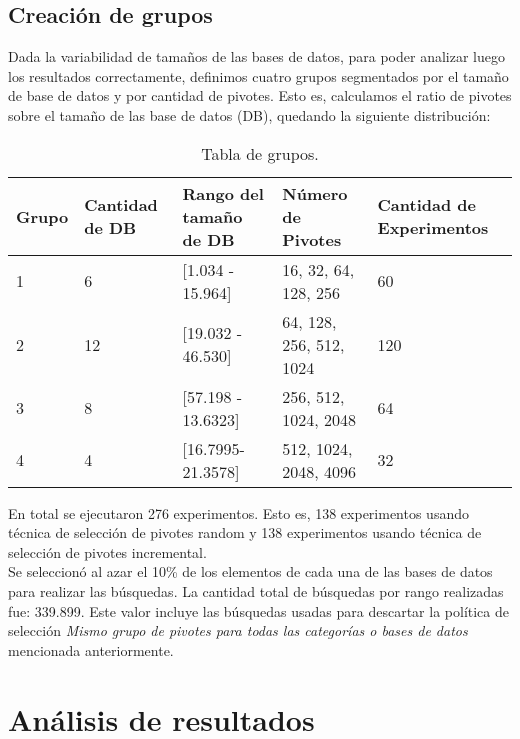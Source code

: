 \subsection{Creaci\'on de grupos}

Dada la variabilidad de tamaños de las bases de datos, para poder analizar luego los resultados correctamente, definimos cuatro grupos segmentados por el tamaño de base de datos y por cantidad de pivotes. Esto es, calculamos el ratio de pivotes sobre el tamaño de las base de datos (DB), quedando la siguiente distribuci\'on:\\

\begin{table}[htbp]
\begin{center}
\begin{tabular}{|p{1.1cm}|p{1.8cm}|p{3.2cm}|p{2.2cm}|p{2.5cm}|}
\hline
Grupo & 
Cantidad de DB & 
Rango del tama\~no de DB & 
N\'umero de Pivotes &  
Cantidad de Experimentos\\
\hline \hline
1 & 
6 & 
[1.034 - 15.964] & 
16, 32, 64, 128, 256 & 
60  \\ \hline
2 &
12 &
[19.032 - 46.530] &
64, 128, 256, 512, 1024 &
120  \\ \hline
3 &
8 &
[57.198 - 13.6323] &
256, 512, 1024, 2048 &
64  \\ \hline
4 &
4 &
[16.7995- 21.3578] &
512, 1024, 2048, 4096 &
32  \\ \hline
\end{tabular}
\caption{Tabla de grupos.}
\label{tabla:grupos}
\end{center}
\end{table}

En total se ejecutaron 276 experimentos. Esto es, 138 experimentos usando t\'ecnica de selecci\'on de pivotes random y 138 experimentos usando t\'ecnica de selecci\'on de pivotes incremental.\\

Se seleccion\'o al azar el 10\% de los elementos de cada una de las bases de datos para realizar las b\'usquedas. La cantidad total de b\'usquedas por rango realizadas fue: 339.899. Este valor incluye las b\'usquedas usadas para descartar la pol\'itica de selecci\'on \textit{Mismo grupo de pivotes para todas las categor\'ias o bases de datos} mencionada anteriormente.\\

\section{An\'alisis de resultados}

